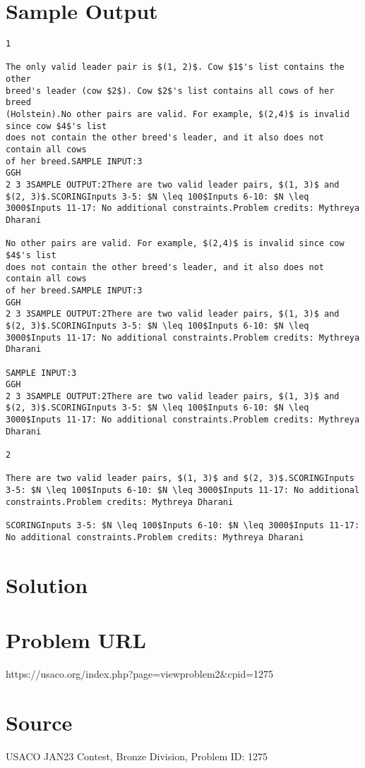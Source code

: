 \documentclass[12pt]{article}
\begin{document}
\section*{Sample Output}
\begin{verbatim}
1

The only valid leader pair is $(1, 2)$. Cow $1$'s list contains the other
breed's leader (cow $2$). Cow $2$'s list contains all cows of her breed
(Holstein).No other pairs are valid. For example, $(2,4)$ is invalid since cow $4$'s list
does not contain the other breed's leader, and it also does not contain all cows
of her breed.SAMPLE INPUT:3
GGH
2 3 3SAMPLE OUTPUT:2There are two valid leader pairs, $(1, 3)$ and $(2, 3)$.SCORINGInputs 3-5: $N \leq 100$Inputs 6-10: $N \leq 3000$Inputs 11-17: No additional constraints.Problem credits: Mythreya Dharani

No other pairs are valid. For example, $(2,4)$ is invalid since cow $4$'s list
does not contain the other breed's leader, and it also does not contain all cows
of her breed.SAMPLE INPUT:3
GGH
2 3 3SAMPLE OUTPUT:2There are two valid leader pairs, $(1, 3)$ and $(2, 3)$.SCORINGInputs 3-5: $N \leq 100$Inputs 6-10: $N \leq 3000$Inputs 11-17: No additional constraints.Problem credits: Mythreya Dharani

SAMPLE INPUT:3
GGH
2 3 3SAMPLE OUTPUT:2There are two valid leader pairs, $(1, 3)$ and $(2, 3)$.SCORINGInputs 3-5: $N \leq 100$Inputs 6-10: $N \leq 3000$Inputs 11-17: No additional constraints.Problem credits: Mythreya Dharani

2

There are two valid leader pairs, $(1, 3)$ and $(2, 3)$.SCORINGInputs 3-5: $N \leq 100$Inputs 6-10: $N \leq 3000$Inputs 11-17: No additional constraints.Problem credits: Mythreya Dharani

SCORINGInputs 3-5: $N \leq 100$Inputs 6-10: $N \leq 3000$Inputs 11-17: No additional constraints.Problem credits: Mythreya Dharani
\end{verbatim}

\section*{Solution}


\section*{Problem URL}
https://usaco.org/index.php?page=viewproblem2&cpid=1275

\section*{Source}
USACO JAN23 Contest, Bronze Division, Problem ID: 1275
\end{document}

